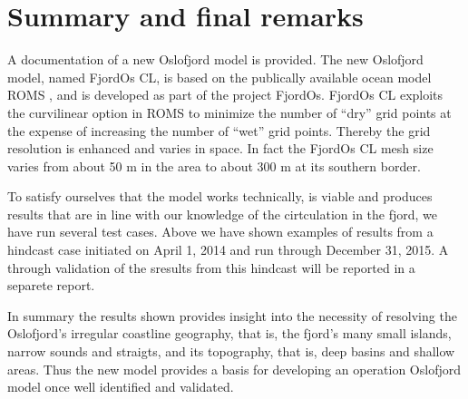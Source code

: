 \newpage
\section{Summary and final remarks}
\label{sec:summa}
A documentation of a new Oslofjord model is provided. The new Oslofjord model, named FjordOs CL, is based on the publically available ocean model ROMS \citep{shche:mcwil:2005,shche:mcwil:2009,haidv:etal:2008}, and is developed as part of the project FjordOs. FjordOs CL exploits the curvilinear option in ROMS to minimize the number of ``dry'' grid points at the expense of increasing the number of ``wet'' grid points. Thereby the grid resolution is enhanced and varies in space. In fact the FjordOs CL mesh size varies from about 50 m in the {\DR} area to about 300 m at its southern border. 

To satisfy ourselves that the model works technically, is viable and produces results that are in line with our knowledge of the cirtculation in the fjord, we have run several test cases. Above we have shown examples of results from a hindcast case initiated on April 1, 2014 and run through December 31, 2015. A through validation of the sresults from this hindcast will be reported in a separete report.

In summary the results shown provides insight into the necessity of resolving the Oslofjord's irregular coastline geography, that is, the fjord's many small islands, narrow sounds and straigts, and its topography, that is, deep basins and shallow areas. Thus the new model provides a basis for developing an operation Oslofjord model once well identified and validated.
